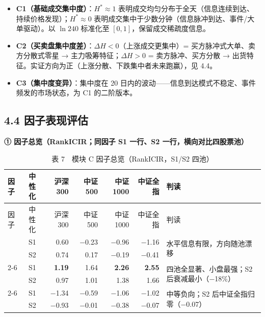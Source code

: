 \documentclass[UTF8,a4paper,zihao=-4,fontset=windows]{ctexart}
\providecommand{\tightlist}{\setlength{\itemsep}{0pt}\setlength{\parskip}{0pt}}
\begin{document}
\begin{itemize}
\tightlist
\item
  \textbf{C1（基础成交集中度）}：\(H^*\approx1\)
  表明成交均匀分布于全天（信息连续到达、持续价格发现）；\(H^*\approx0\)
  表明成交集中于少数分钟（信息脉冲到达、事件/大单驱动）。以 \(\ln 240\)
  标准化至 \([0,1]\)，保留成交稀疏度信息。
\item
  \textbf{C2（买卖盘集中度差）}：\(\Delta H<0\)（上涨成交更集中）=
  买方脉冲式大单、卖方分散式零星 → 主力吸筹特征；\(\Delta H>0\) =
  卖方脉冲、买方分散 →
  出货特征。实证方向为正（上涨分散、下跌集中者未来跑赢），见 4.4。
\item
  \textbf{C3（集中度变异）}：集中度在 20
  日内的波动------信息到达模式不稳定、事件频发的市场状态，为 C1
  的二阶版本。
\end{itemize}

\subsection{4.4
因子表现评估}\label{ux56e0ux5b50ux8868ux73b0ux8bc4ux4f30-2}

\textbf{① 因子总览（RankICIR；同因子 S1 一行、S2
一行，横向对比四股票池）}

\begin{longtable}{@{}p{3.0cm} c r r r r p{5.2cm}@{}}
\caption{表 7　模块 C 因子总览（RankICIR，S1/S2 四池）}\\
\toprule
因子 & 中性化 & 沪深300 & 中证500 & 中证1000 & 中证全指 & 判读 \\
\midrule
\endfirsthead
\toprule
因子 & 中性化 & 沪深300 & 中证500 & 中证1000 & 中证全指 & 判读 \\
\midrule
\endhead
\bottomrule
\endfoot
\multirow{2}{\hsize}{\textbf{C1 集中度熵}} & S1 & 0.60 & −0.23 & −0.96 & −1.16 & \multirow{2}{\hsize}{水平信息有限，方向随池漂移} \\
 & S2 & 0.74 & 0.17 & −0.19 & −0.41 & \\
\cmidrule(lr){2-6}
\multirow{2}{\hsize}{\textbf{C2 买卖盘集中差}} & S1 & \textbf{1.19} & 1.64 & \textbf{2.26} & \textbf{2.55} & \multirow{2}{\hsize}{四池全显著、小盘最强；S2 后衰减最小（−18\%）} \\
 & S2 & 0.97 & 1.01 & 1.38 & 1.66 & \\
\cmidrule(lr){2-6}
\multirow{2}{\hsize}{\textbf{C3 集中度变异}} & S1 & −1.34 & −0.59 & −1.06 & −1.02 & \multirow{2}{\hsize}{中等负向；S2 后中证全指归零（−0.07）} \\
 & S2 & −0.93 & −0.01 & −0.38 & −0.07 & \\
\end{longtable}
\end{document}
